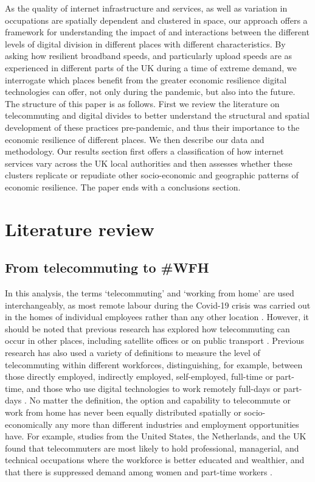\documentclass[,]{sagej}
\begin{document}
As the quality of internet infrastructure and services, as well as
variation in occupations are spatially dependent and clustered in space,
our approach offers a framework for understanding the impact of and
interactions between the different levels of digital division in
different places with different characteristics. By asking how resilient
broadband speeds, and particularly upload speeds are as experienced in
different parts of the UK during a time of extreme demand, we
interrogate which places benefit from the greater economic resilience
digital technologies can offer, not only during the pandemic, but also
into the future. The structure of this paper is as follows. First we
review the literature on telecommuting and digital divides to better
understand the structural and spatial development of these practices
pre-pandemic, and thus their importance to the economic resilience of
different places. We then describe our data and methodology. Our results
section first offers a classification of how internet services vary
across the UK local authorities and then assesses whether these clusters
replicate or repudiate other socio-economic and geographic patterns of
economic resilience. The paper ends with a conclusions section.

\hypertarget{sec:2}{%
\section{Literature review}\label{sec:2}}

\hypertarget{sec:2.1}{%
\subsection{From telecommuting to \#WFH}\label{sec:2.1}}

In this analysis, the terms `telecommuting' and `working from home' are
used interchangeably, as most remote labour during the Covid-19 crisis
was carried out in the homes of individual employees rather than any
other location \citep{eurofound2020}. However, it should be noted that
previous research has explored how telecommuting can occur in other
places, including satellite offices or on public transport
\citep{felstead2012rapid, siha2006telecommuting}. Previous research has
also used a variety of definitions to measure the level of telecommuting
within different workforces, distinguishing, for example, between those
directly employed, indirectly employed, self-employed, full-time or
part-time, and those who use digital technologies to work remotely
full-days or part-days
\citep{allen2015effective, bailey2002review, haddad2009examination}. No
matter the definition, the option and capability to telecommute or work
from home has never been equally distributed spatially or
socio-economically any more than different industries and employment
opportunities have. For example, studies from the United States, the
Netherlands, and the UK found that telecommuters are most likely to hold
professional, managerial, and technical occupations where the workforce
is better educated and wealthier, and that there is suppressed demand
among women and part-time workers
\citep{headicar2016move, peters2004employees, singh2013modeling}.
\end{document}
